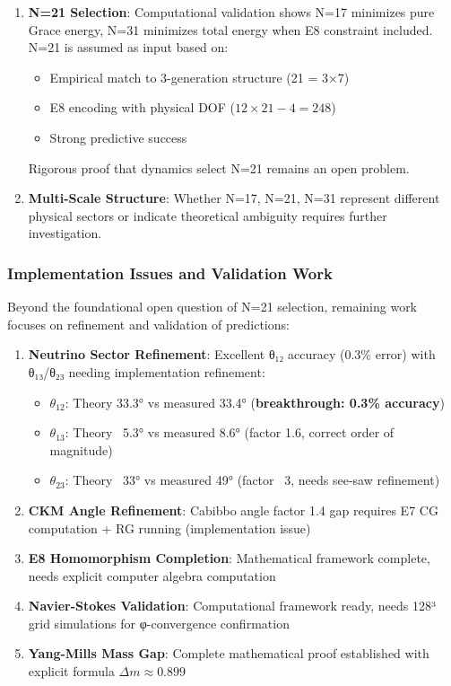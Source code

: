 \documentclass[12pt,a4paper]{article}
\begin{document}
\begin{enumerate}
\item \textbf{N=21 Selection}: Computational validation shows N=17 minimizes pure Grace energy, N=31 minimizes total energy when E8 constraint included. N=21 is assumed as input based on:
   \begin{itemize}
   \item Empirical match to 3-generation structure (21 = 3×7)
   \item E8 encoding with physical DOF ($12 \times 21 - 4 = 248$)
   \item Strong predictive success
   \end{itemize}
   Rigorous proof that dynamics select N=21 remains an open problem.

\item \textbf{Multi-Scale Structure}: Whether N=17, N=21, N=31 represent different physical sectors or indicate theoretical ambiguity requires further investigation.
\end{enumerate}

\subsubsection{Implementation Issues and Validation Work}

Beyond the foundational open question of N=21 selection, remaining work focuses on refinement and validation of predictions:

\begin{enumerate}
\item \textbf{Neutrino Sector Refinement}: Excellent θ₁₂ accuracy (0.3\% error) with θ₁₃/θ₂₃ needing implementation refinement:
   \begin{itemize}
   \item $\theta_{12}$: Theory 33.3° vs measured 33.4° (\textbf{breakthrough: 0.3\% accuracy})
   \item $\theta_{13}$: Theory ~5.3° vs measured 8.6° (factor 1.6, correct order of magnitude)
   \item $\theta_{23}$: Theory ~33° vs measured 49° (factor ~3, needs see-saw refinement)
   \end{itemize}

\item \textbf{CKM Angle Refinement}: Cabibbo angle factor 1.4 gap requires E7 CG computation + RG running (implementation issue)

\item \textbf{E8 Homomorphism Completion}: Mathematical framework complete, needs explicit computer algebra computation

\item \textbf{Navier-Stokes Validation}: Computational framework ready, needs 128³ grid simulations for φ-convergence confirmation

\item \textbf{Yang-Mills Mass Gap}: Complete mathematical proof established with explicit formula $\Delta m \approx 0.899$
\end{enumerate}
\end{document}

